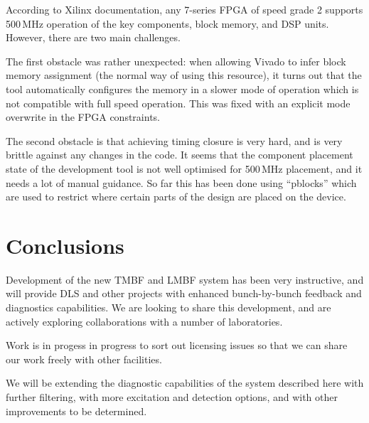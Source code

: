 \documentclass[
    a4paper,
    keeplastbox,            %
    hyphens,                %
]{jacow-2_1}
\begin{document}
According to Xilinx documentation, any 7-series FPGA of speed grade 2 supports
500\,MHz operation of the key components, block memory, and DSP units.  However,
there are two main challenges.

The first obstacle was rather unexpected: when allowing Vivado to infer block
memory assignment (the normal way of using this resource), it turns out that the
tool automatically configures the memory in a slower mode of operation which is
not compatible with full speed operation.  This was fixed with an explicit mode
overwrite in the FPGA constraints.

The second obstacle is that achieving timing closure is very hard, and is very
brittle against any changes in the code.  It seems that the component placement
state of the development tool is not well optimised for 500\,MHz placement, and
it needs a lot of manual guidance.  So far this has been done using ``pblocks''
which are used to restrict where certain parts of the design are placed on the
device.


\section{Conclusions}

Development of the new TMBF and LMBF system has been very instructive, and will
provide DLS and other projects with enhanced bunch-by-bunch feedback and
diagnostics capabilities.  We are looking to share this development, and are
actively exploring collaborations with a number of laboratories.

Work is in progess in progress to sort out licensing issues so that we can share
our work freely with other facilities.

We will be extending the diagnostic capabilities of the system described here
with further filtering, with more excitation and detection options, and with
other improvements to be determined.
\end{document}
